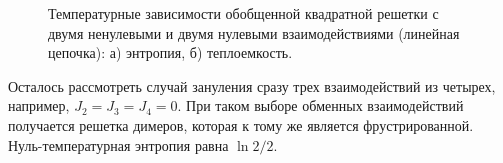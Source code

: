 \documentclass[utf8,12pt]{jetp}
\begin{document}
\begin{figure}[h]
	\begin{minipage}[h]{0.5\linewidth}
	\end{minipage}
	\hfill
	\begin{minipage}[h]{0.5\linewidth}
	\end{minipage}
	\caption{Температурные зависимости обобщенной квадратной решетки с двумя ненулевыми и двумя нулевыми взаимодействиями (линейная цепочка): а) энтропия, б) теплоемкость.}
	\label{Linear}
\end{figure}

Осталось рассмотреть случай зануления сразу трех взаимодействий из четырех, например, $J_2 = J_3 = J_4 = 0$. При таком выборе обменных взаимодействий получается решетка димеров, которая к тому же является фрустрированной. Нуль-температурная энтропия равна $\ln 2/2$.
\end{document}
